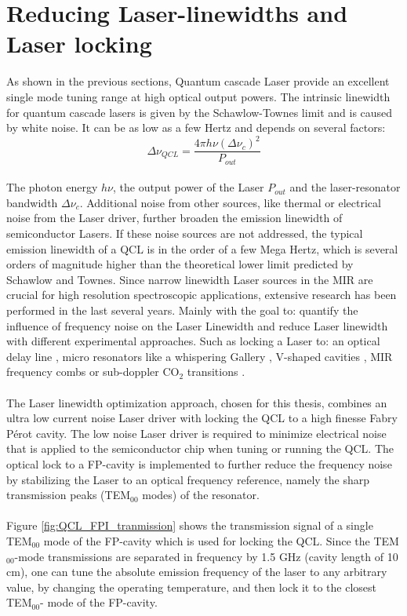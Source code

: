 \section{Reducing Laser-linewidths and Laser locking}
As shown in the previous sections, Quantum cascade Laser provide an excellent single mode tuning range at high optical output powers. The intrinsic linewidth for quantum cascade lasers is given by the Schawlow-Townes limit \cite{Shawlow-Twones} and is caused by white noise. It can be as low as a few Hertz and depends on several factors:
\begin{equation}
	\Delta \nu_{QCL}=\frac{4\pi h \nu (\Delta \nu_c)^2}{P_{out}}
\end{equation}\\
The photon energy $h\nu$, the output power of the Laser $P_{out}$ and the laser-resonator bandwidth $\Delta \nu_c$. Additional noise from other sources, like thermal or electrical noise from the Laser driver, further broaden the emission linewidth of semiconductor Lasers. If these noise sources are not addressed, the typical emission linewidth of a QCL is in the order of a few Mega Hertz, which is several orders of magnitude higher than the theoretical lower limit predicted by Schawlow and Townes. Since narrow linewidth Laser sources in the MIR are crucial for high resolution spectroscopic applications, extensive research has been performed in the last several years. Mainly with the goal to: quantify the influence of frequency noise on the Laser Linewidth \cite{DiDomenico-2010} and reduce Laser linewidth with different experimental approaches. Such as locking a Laser to: an optical delay line \cite{Shezad-2019}, micro resonators like a whispering Gallery \cite{deCumis-2016}, V-shaped cavities \cite{Fasci-2014}, MIR frequency combs  or sub-doppler CO$_2$ transitions \cite{Cappelli-2012}. \\\\
\noindent
The Laser linewidth optimization approach, chosen for this thesis, combines an ultra low current noise Laser driver with locking the QCL to a high finesse Fabry Pérot cavity. The low noise Laser driver is required to minimize electrical noise that is applied to the semiconductor chip when tuning or running the QCL. The optical lock to a FP-cavity is implemented to further reduce the frequency noise by stabilizing the Laser to an optical frequency reference, namely the sharp transmission peaks (TEM$_{00}$ modes) of the resonator. \\\\
\noindent
Figure \ref{fig:QCL_FPI_tranmission} shows the transmission signal of a single TEM$_{00}$ mode of the FP-cavity which is used for locking the QCL. Since the TEM$_{00}$-mode transmissions are separated in frequency by 1.5 GHz (cavity length of 10 cm), one can tune the absolute emission frequency of the laser to any arbitrary value, by changing the operating temperature, and then lock it to the closest TEM$_{00}$- mode of the FP-cavity. \\\\

